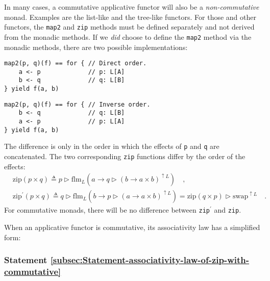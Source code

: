 In many cases, a commutative applicative functor will also be a \emph{non-commutative}
monad. Examples are the list-like and the tree-like functors. For
those and other functors, the \lstinline!map2! and \lstinline!zip!
methods must be defined separately and not derived from the monadic
methods. If we \emph{did} choose to define the \lstinline!map2! method
via the monadic methods, there are two possible implementations:\vspace{0.4\baselineskip}

\noindent %
\begin{minipage}[c][1\totalheight][t]{0.45\columnwidth}%
\begin{lstlisting}
map2(p, q)(f) == for { // Direct order.
    a <- p             // p: L[A]
    b <- q             // q: L[B]
} yield f(a, b)
\end{lstlisting}
%
\end{minipage}\hfill{}%
\begin{minipage}[c][1\totalheight][t]{0.45\columnwidth}%
\begin{lstlisting}
map2(p, q)(f) == for { // Inverse order.
    b <- q             // q: L[B]
    a <- p             // p: L[A]
} yield f(a, b)
\end{lstlisting}
%
\end{minipage}

\noindent The difference is only in the order in which the effects
of \lstinline!p! and \lstinline!q! are concatenated. The two corresponding
\lstinline!zip! functions differ by the order of the effects:
\begin{align*}
 & \text{zip}\left(p\times q\right)\triangleq p\triangleright\text{flm}_{L}(a\rightarrow q\triangleright(b\rightarrow a\times b)^{\uparrow L})\quad,\\
 & \text{zip}^{\prime}\left(p\times q\right)\triangleq q\triangleright\text{flm}_{L}(b\rightarrow p\triangleright(a\rightarrow a\times b)^{\uparrow L})=\text{zip}\left(q\times p\right)\triangleright\text{swap}^{\uparrow L}\quad.
\end{align*}
For commutative monads, there will be no difference between \lstinline!zip!$^{\prime}$
and \lstinline!zip!. 

When an applicative functor is commutative, its associativity law
has a simplified form:

\subsubsection{Statement \label{subsec:Statement-associativity-law-of-zip-with-commutative}\ref{subsec:Statement-associativity-law-of-zip-with-commutative}}

